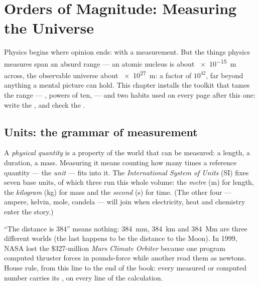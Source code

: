 \chapter{Orders of Magnitude: Measuring the Universe}\label{ch:g10:orders-of-magnitude}

Physics begins where opinion ends: with a measurement. But the things
physics measures span an absurd range --- an atomic nucleus is about
\qty{e-15}{m} across, the observable universe about \qty{e27}{m}: a
factor of $10^{42}$, far beyond anything a mental picture can hold.
This chapter installs the toolkit that tames the range --- ,
powers of ten,  --- and two habits used on every
page after this one: write the , and check the .

\section{Units: the grammar of measurement}

\begin{definition}\label{def:g10:orders-of-magnitude:unit}
A \emph{physical quantity} is a property of
the world that can be measured: a length, a duration, a mass.
Measuring it means counting how many times a reference quantity ---
the \emph{unit} --- fits into it. The
\emph{International System of Units} (SI) fixes seven base units, of which three run this whole
volume: the \emph{metre} (\unit{m}) for length, the
\emph{kilogram} (\unit{kg}) for mass and the
\emph{second} (\unit{s}) for time. (The other four ---
ampere, kelvin, mole, candela --- will join when electricity, heat and
chemistry enter the story.)
\end{definition}

\begin{remark}\label{rem:g10:orders-of-magnitude:units}
``The distance is $384$'' means nothing: \qty{384}{mm},
\qty{384}{km} and \qty{384}{Mm} are three different worlds (the last
happens to be the distance to the Moon). In 1999, NASA lost the
\$327-million \emph{Mars Climate Orbiter} because one program computed
thruster forces in pounds-force while another read them as newtons.
House rule, from this line to the end of the book: every measured or
computed number carries its , on every line of the calculation.
\end{remark}

